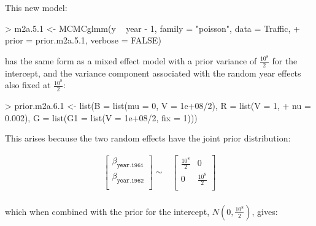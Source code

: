 \documentclass{article}
\begin{document}
This new model:

\begin{Schunk}
\begin{Sinput}
> m2a.5.1 <- MCMCglmm(y ~ year - 1, family = "poisson", data = Traffic, 
+     prior = prior.m2a.5.1, verbose = FALSE)
\end{Sinput}
\end{Schunk}

has the same form as a mixed effect model with a prior variance of $\frac{10^{8}}{2}$ for the intercept, and the variance component associated with the random year effects also fixed at $\frac{10^{8}}{2}$:

\begin{Schunk}
\begin{Sinput}
> prior.m2a.6.1 <- list(B = list(mu = 0, V = 1e+08/2), R = list(V = 1, 
+     nu = 0.002), G = list(G1 = list(V = 1e+08/2, fix = 1)))
\end{Sinput}
\end{Schunk}


This arises because the two random effects have the joint prior distribution:

\begin{equation}
\begin{array}{rl}
\left[
\begin{array}{c}
 \beta_{\texttt{year.1961}}\\
 \beta_{\texttt{year.1962}}\\
\end{array}
\right]
\sim
&
\left[
\begin{array}{cc}
\frac{10^{8}}{2}&0\\
0&\frac{10^{8}}{2}\\
\end{array}
\right]\\
\end{array}
\end{equation}

which when combined with the prior for the intercept, $N(0, \frac{10^{8}}{2})$, gives:
\end{document}
